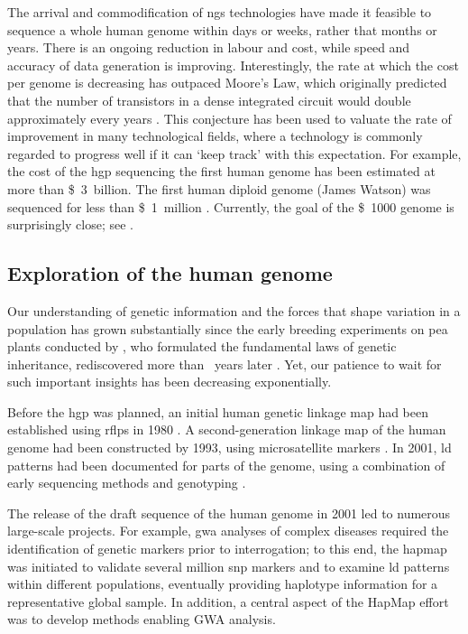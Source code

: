 %

%

The arrival and commodification of \gls{ngs} technologies have made it feasible to sequence a whole human genome within days or weeks, rather that months or years.
There is an ongoing reduction in labour and cost, while speed and accuracy of data generation is improving.
Interestingly, the rate at which the cost per genome is decreasing has outpaced Moore's Law, which originally predicted that the number of transistors in a dense integrated circuit would double approximately every  years \citep{moore1965}.
This conjecture has been used to valuate the rate of improvement in many technological fields, where a technology is commonly regarded to progress well if it can `keep track' with this expectation.
For example, the cost of the \gls{hgp} sequencing the first human genome has been estimated at more than \SI{3}[\$]{billion}.
The first human diploid genome (James Watson) was sequenced for less than \SI{1}[\$]{million} \citep{Wheeler:2008bb}.
Currently, the goal of the \SI{1000}[\$]{} genome is surprisingly close; see .


%
\subsection{Exploration of the human genome}
%

Our understanding of genetic information and the forces that shape variation in a population has grown substantially since the early breeding experiments on pea plants conducted by \citet{Mendel1866}, who formulated the fundamental laws of genetic inheritance, rediscovered more than ~years later \citep{correns1899,vries1900,tschermak1900}.
Yet, our patience to wait for such important insights has been decreasing exponentially.

Before the \gls{hgp} was planned, an initial human genetic linkage map had been established using \glspl{rflp} in 1980 \citep{Botstein:1980wg}.
A second-generation linkage map of the human genome had been constructed by 1993, using microsatellite markers \citep{Weissenbach:1993et}.
In 2001, \gls{ld} patterns had been documented for parts of the genome, using a combination of early sequencing methods and genotyping \citep{Daly:2001ka,Reich:2001ff}.

The release of the draft sequence of the human genome in 2001 led to numerous large-scale projects.
For example, \gls{gwa} analyses of complex diseases required the identification of genetic markers prior to interrogation; to this end, the \gls{hapmap} was initiated to validate several million \gls{snp} markers and to examine \gls{ld} patterns within different populations, eventually providing haplotype information for a representative global sample.
In addition, a central aspect of the HapMap effort was to develop methods enabling GWA analysis.

